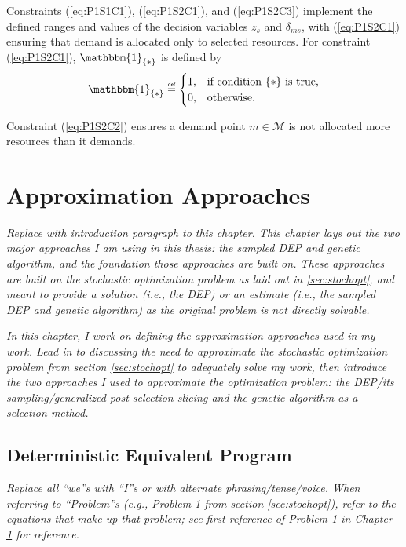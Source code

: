 \documentclass[12pt,dvipsnames]{report}
\newcommand\defeq{\mathrel{\overset{\makebox[0pt]{\mbox{\normalfont\tiny\sffamily def}}}{=}}}
\begin{document}
Constraints (\ref{eq:P1S1C1}), (\ref{eq:P1S2C1}), and (\ref{eq:P1S2C3}) implement the defined ranges and values of the decision variables $z_s$ and $\delta_{ms}$, with (\ref{eq:P1S2C1}) ensuring that demand is allocated only to selected resources.  For constraint (\ref{eq:P1S2C1}), $\mathbbm{1}_{\{*\}}$ is defined by
\[ \mathbbm{1}_{\{*\}} \defeq
	\begin{cases}
		1,& \text{if condition $\{*\}$ is true,}\\
		0,& \text{otherwise}.
	\end{cases}
\]

Constraint (\ref{eq:P1S2C2}) ensures a demand point $m \in \mathcal{M}$ is not allocated more resources than it demands.
\fi

\iftrue
\pagebreak
\chapter{Approximation Approaches} \label{ch:approaches}


\textit{Replace with introduction paragraph to this chapter.  This chapter lays out the two major approaches I am using in this thesis: the sampled DEP and genetic algorithm, and the foundation those approaches are built on.  These approaches are built on the stochastic optimization problem as laid out in \ref{sec:stochopt}, and meant to provide a solution (i.e., the DEP) or an estimate (i.e., the sampled DEP and genetic algorithm) as the original problem is not directly solvable.}

\textit{In this chapter, I work on defining the approximation approaches used in my work.  Lead in to discussing the need to approximate the stochastic optimization problem from section \ref{sec:stochopt} to adequately solve my work, then introduce the two approaches I used to approximate the optimization problem: the DEP/its sampling/generalized post-selection slicing and the genetic algorithm as a selection method.}

\section{Deterministic Equivalent Program} \label{sec:dep}

\textit{Replace all ``we''s with ``I''s or with alternate phrasing/tense/voice.  When referring to ``Problem''s (e.g., Problem 1 from section \ref{sec:stochopt}), refer to the equations that make up that problem; see first reference of Problem 1 in Chapter \ref{ch:approaches} for reference.}
\end{document}
